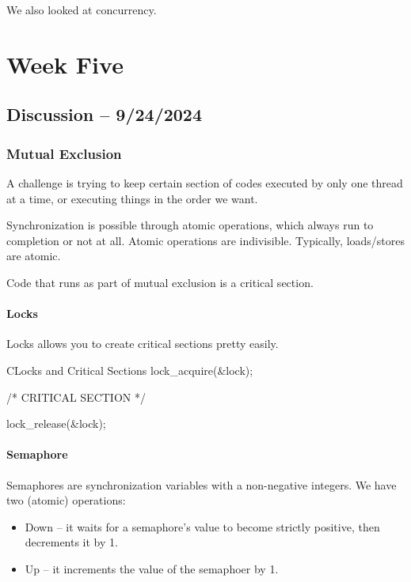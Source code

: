 \documentclass[openany]{book}
\begin{document}
We also looked at concurrency.

\chapter{Week Five}
\section{Discussion -- 9/24/2024}
\subsection{Mutual Exclusion}
A challenge is trying to keep certain section of codes executed by only one thread at a time, or executing things in the order we want.

Synchronization is possible through atomic operations, which always run to completion or not at all. Atomic operations are indivisible. Typically, loads/stores are atomic.

Code that runs as part of mutual exclusion is a critical section.

\subsubsection{Locks}
Locks allows you to create critical sections pretty easily.

\begin{code}{C}{Locks and Critical Sections}
lock_acquire(&lock);

/* CRITICAL SECTION */

lock_release(&lock);
\end{code}

\subsubsection{Semaphore}
Semaphores are synchronization variables with a non-negative integers. We have two (atomic) operations:
\begin{itemize}
	\item Down -- it waits for a semaphore's value to become strictly positive, then decrements it by 1.
	\item Up -- it increments the value of the semaphoer by 1.
\end{itemize}
\end{document}
